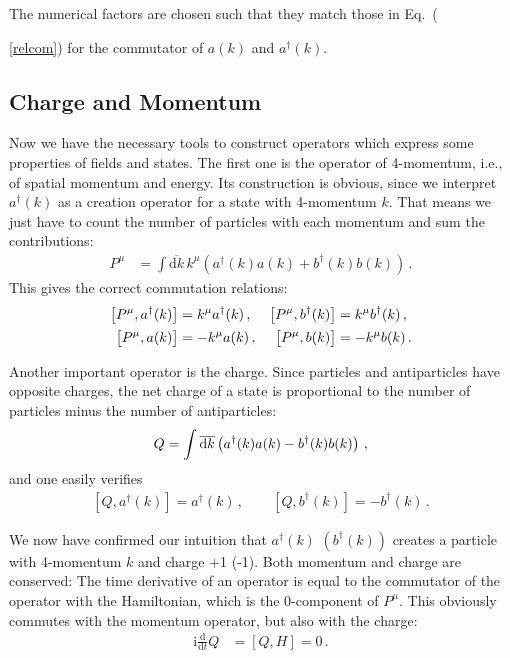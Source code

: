 \documentclass[12pt]{report}
\renewcommand{\d}{\text{d}}
\newcommand{\dkbar}{\ensuremath{\overline{\d k}}}
\renewcommand{\i}{\ensuremath{\text{i}}}
\newcommand{\2}{\ensuremath{\sqrt{2}\,}}
\renewcommand{\d}{\ensuremath{\text{d}}}
\begin{document}
      The numerical factors are chosen such that they match those in Eq.~({\ref{relcom}) for the 
      commutator of $a(k)$ and $a^\dagger(k)$.  


      \subsection{Charge and Momentum}
      Now we have the necessary tools to construct operators which express some properties of fields 
      and states.  The first one is the operator of 4-momentum, i.e., of spatial momentum and
      energy.  Its construction is obvious, since we interpret $a^\dagger(k)$ as a creation operator
      for a state with 4-momentum $k$. That means we just have to count the number of particles with
      each momentum and sum the contributions:
      \begin{align}
        P^\mu &= \int\dkbar \, k^\mu \left(a^\dagger(k) a(k) + b^\dagger(k)b(k)\right)\,.
      \end{align}
      This gives the correct commutation relations:
      \begin{subequations}
        \begin{align}
          \left[P^\mu,a^\dagger(k)\right]&= k^\mu a^\dagger(k)\,, & \left[P^\mu,b^\dagger(k)\right]&= k^\mu
          b^\dagger(k)\,,\\
          \left[P^\mu, a(k)\vphantom{a^\dagger}\right]&=-k^\mu a(k)\,, & \left[P^\mu,
            b(k)\vphantom{a^\dagger} \right]&=-k^\mu b(k)\,.
        \end{align}
      \end{subequations}  
        
      Another important operator is the charge. Since particles and antiparticles have opposite 
      charges, the
      net charge of a state is proportional to the number of particles minus the number of
      antiparticles: 
      \begin{gather}\index{Charge operator}
        Q=\int\dkbar \left(a^\dagger(k) a(k) - b^\dagger(k)b(k)\right)\,,
      \end{gather}  
       and one easily verifies
       \begin{gather}       
       \left[Q, a^\dagger(k)\right]=a^\dagger(k)\,,\qquad \left[Q,
          b^\dagger(k)\right]=-b^\dagger(k)\,. 
      \end{gather}

      We now have confirmed our intuition that $a^\dagger(k)$ $\left(b^\dagger (k)\right)$
      creates a particle with 4-momentum $k$ and charge +1 (-1). Both momentum and charge are
      conserved: The time derivative of an operator is equal to the commutator of the operator with
      the Hamiltonian, which is the 0-component of $P^\mu$. This obviously commutes with the
      momentum operator, but also with the charge:
      \begin{align}
        \i \frac{\d}{\d t} Q &= \left[Q,H\right] = 0 \,.
      \end{align}

}
\end{document}

